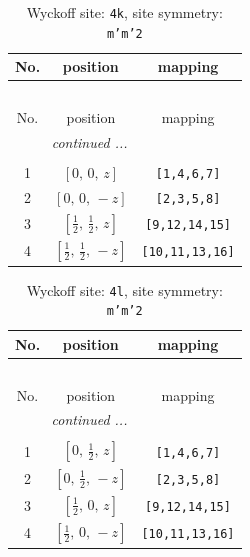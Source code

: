 \documentclass[fleqn,8pt]{jsarticle}
\begin{document}
\renewcommand{\arraystretch}{1.2}
\begin{longtable}{ccc}
\caption{Wyckoff site: {\tt 4k}, site symmetry: {\tt m'm'2}}
 \\
 \hline \hline
No. & position & mapping \\ \hline \endfirsthead

\multicolumn{2}{l}{\tablename\ \thetable{}} \\
 \hline \hline
No. & position & mapping \\ \hline \endhead

 \hline \hline
\multicolumn{2}{r}{\footnotesize\it continued ...} \\ \endfoot

 \hline \hline
\multicolumn{2}{r}{} \\ \endlastfoot

1 & $\left[ 0,\, 0,\, z \right]$ & {\tt [1,4,6,7]} \\ \hline
2 & $\left[ 0,\, 0,\, - z \right]$ & {\tt [2,3,5,8]} \\ \hline
3 & $\left[ \frac{1}{2},\, \frac{1}{2},\, z \right]$ & {\tt [9,12,14,15]} \\ \hline
4 & $\left[ \frac{1}{2},\, \frac{1}{2},\, - z \right]$ & {\tt [10,11,13,16]} \\
\end{longtable}
\renewcommand{\arraystretch}{1.2}
\begin{longtable}{ccc}
\caption{Wyckoff site: {\tt 4l}, site symmetry: {\tt m'm'2}}
 \\
 \hline \hline
No. & position & mapping \\ \hline \endfirsthead

\multicolumn{2}{l}{\tablename\ \thetable{}} \\
 \hline \hline
No. & position & mapping \\ \hline \endhead

 \hline \hline
\multicolumn{2}{r}{\footnotesize\it continued ...} \\ \endfoot

 \hline \hline
\multicolumn{2}{r}{} \\ \endlastfoot

1 & $\left[ 0,\, \frac{1}{2},\, z \right]$ & {\tt [1,4,6,7]} \\ \hline
2 & $\left[ 0,\, \frac{1}{2},\, - z \right]$ & {\tt [2,3,5,8]} \\ \hline
3 & $\left[ \frac{1}{2},\, 0,\, z \right]$ & {\tt [9,12,14,15]} \\ \hline
4 & $\left[ \frac{1}{2},\, 0,\, - z \right]$ & {\tt [10,11,13,16]} \\
\end{longtable}
\end{document}
